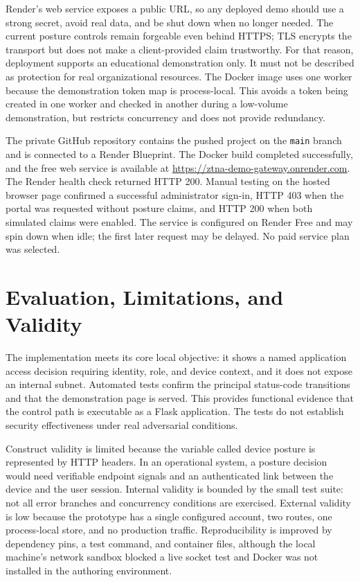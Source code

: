 Render's web service exposes a public URL, so any deployed demo should use a strong secret, avoid real data, and be shut down when no longer needed. The current posture controls remain forgeable even behind HTTPS; TLS encrypts the transport but does not make a client-provided claim trustworthy. For that reason, deployment supports an educational demonstration only. It must not be described as protection for real organizational resources. The Docker image uses one worker because the demonstration token map is process-local. This avoids a token being created in one worker and checked in another during a low-volume demonstration, but restricts concurrency and does not provide redundancy.

The private GitHub repository contains the pushed project on the \texttt{main} branch and is connected to a Render Blueprint. The Docker build completed successfully, and the free web service is available at \url{https://ztna-demo-gateway.onrender.com}. The Render health check returned HTTP 200. Manual testing on the hosted browser page confirmed a successful administrator sign-in, HTTP 403 when the portal was requested without posture claims, and HTTP 200 when both simulated claims were enabled. The service is configured on Render Free and may spin down when idle; the first later request may be delayed. No paid service plan was selected.

\section{Evaluation, Limitations, and Validity}
The implementation meets its core local objective: it shows a named application access decision requiring identity, role, and device context, and it does not expose an internal subnet. Automated tests confirm the principal status-code transitions and that the demonstration page is served. This provides functional evidence that the control path is executable as a Flask application. The tests do not establish security effectiveness under real adversarial conditions.

Construct validity is limited because the variable called device posture is represented by HTTP headers. In an operational system, a posture decision would need verifiable endpoint signals and an authenticated link between the device and the user session. Internal validity is bounded by the small test suite: not all error branches and concurrency conditions are exercised. External validity is low because the prototype has a single configured account, two routes, one process-local store, and no production traffic. Reproducibility is improved by dependency pins, a test command, and container files, although the local machine's network sandbox blocked a live socket test and Docker was not installed in the authoring environment.

